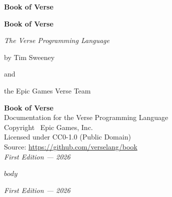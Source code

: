 \documentclass[11pt,openright,twoside]{book}
\begin{document}
\frontmatter

\begin{titlepage}
\centering
\vspace*{3in}
{\Huge\sffamily\bfseries Book of Verse}
\vfill
\end{titlepage}

\cleardoublepage

\begin{titlepage}
\centering
\vspace*{1.5in}
{\Huge\sffamily\bfseries\color{versegray} Book of Verse}\par
\vspace{0.5in}
{\Large\itshape The Verse Programming Language}\par
\vspace{0.5in}
{\large by Tim Sweeney}\par
\vspace{0.15in}
{\large and}\par
\vspace{0.15in}
{\large the Epic Games Verse Team}
\vfill
\end{titlepage}

\cleardoublepage

\thispagestyle{empty}
\vspace*{\fill}
\begin{center}
\textbf{Book of Verse}\\[1em]
Documentation for the Verse Programming Language\\[2em]
Copyright \textcopyright\ Epic Games, Inc.\\[1em]
Licensed under CC0-1.0 (Public Domain)\\[2em]
Source: \url{https://github.com/verselang/book}\\[2em]
\textit{First Edition --- 2026}
\end{center}
\vfill
\cleardoublepage

\tableofcontents
\cleardoublepage

\mainmatter

$body$

\backmatter

\cleardoublepage
\thispagestyle{empty}
\vspace*{\fill}
\begin{center}
\textit{First Edition --- 2026}
\end{center}
\vfill

\newpage\thispagestyle{empty}\mbox{}%
\end{document}

